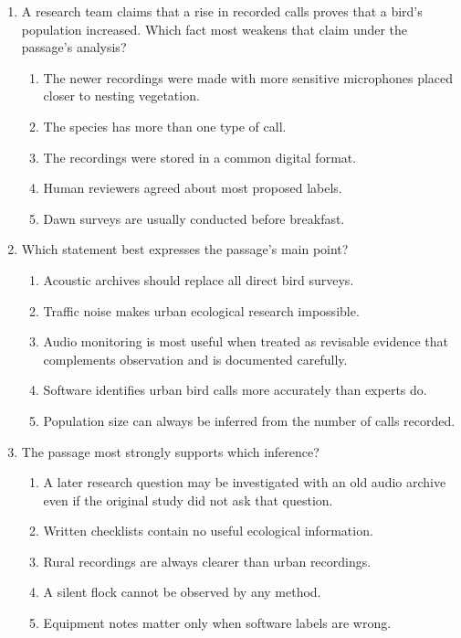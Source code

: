 \begin{enumerate}
\item A research team claims that a rise in recorded calls proves that a bird's
population increased. Which fact most weakens that claim under the passage's
analysis?
  \begin{enumerate}
  \item The newer recordings were made with more sensitive microphones placed
        closer to nesting vegetation.
  \item The species has more than one type of call.
  \item The recordings were stored in a common digital format.
  \item Human reviewers agreed about most proposed labels.
  \item Dawn surveys are usually conducted before breakfast.
  \end{enumerate}

\item Which statement best expresses the passage's main point?
  \begin{enumerate}
  \item Acoustic archives should replace all direct bird surveys.
  \item Traffic noise makes urban ecological research impossible.
  \item Audio monitoring is most useful when treated as revisable evidence that
        complements observation and is documented carefully.
  \item Software identifies urban bird calls more accurately than experts do.
  \item Population size can always be inferred from the number of calls recorded.
  \end{enumerate}

\item The passage most strongly supports which inference?
  \begin{enumerate}
  \item A later research question may be investigated with an old audio archive
        even if the original study did not ask that question.
  \item Written checklists contain no useful ecological information.
  \item Rural recordings are always clearer than urban recordings.
  \item A silent flock cannot be observed by any method.
  \item Equipment notes matter only when software labels are wrong.
  \end{enumerate}


\end{enumerate}
